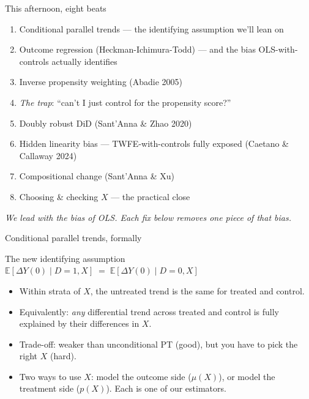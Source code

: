 \documentclass[aspectratio=169,11pt]{beamer}
\begin{document}
\begin{frame}{This afternoon, eight beats}
\vspace{0.3em}
\begin{enumerate}\small
  \item Conditional parallel trends --- the identifying assumption we'll lean on
  \item Outcome regression (Heckman-Ichimura-Todd) --- and the bias OLS-with-controls actually identifies
  \item Inverse propensity weighting (Abadie 2005)
  \item \textit{The trap}: ``can't I just control for the propensity score?''
  \item Doubly robust DiD (Sant'Anna \& Zhao 2020)
  \item Hidden linearity bias --- TWFE-with-controls fully exposed (Caetano \& Callaway 2024)
  \item Compositional change (Sant'Anna \& Xu)
  \item Choosing \& checking $X$ --- the practical close
\end{enumerate}
\vspace{0.4em}
\begin{center}
\small\color{warmgray}\itshape
We lead with the bias of OLS. \;\;Each fix below removes one piece of that bias.
\end{center}
\end{frame}


\begin{frame}{Conditional parallel trends, formally}
\vspace{0.4em}
\begin{block}{The new identifying assumption}
\small
\centering
$\mathbb{E}[\Delta Y(0) \mid D{=}1, X] \;=\; \mathbb{E}[\Delta Y(0) \mid D{=}0, X]$
\end{block}
\vspace{0.5em}
\begin{itemize}\small
  \item Within strata of $X$, the untreated trend is the same for treated and control.
  \item Equivalently: \textit{any} differential trend across treated and control is fully explained by their differences in $X$.
  \item Trade-off: weaker than unconditional PT (good), but you have to pick the right $X$ (hard).
  \item Two ways to use $X$: model the outcome side ($\mu(X)$), or model the treatment side ($p(X)$). Each is one of our estimators.
\end{itemize}
\end{frame}
\end{document}
